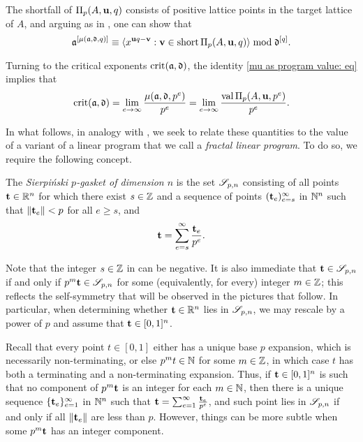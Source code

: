 \documentclass[11pt]{amsart}
\newcommand{\short}{\operatorname{short}}
\begin{document}
The shortfall of $\Pi_p(A, \mathbf{u}, q)$ consists of positive lattice points in the target lattice of $A$, and arguing as in , one can show that
%
\begin{equation}
\label{algebraic shortfall PI_p general: e}
 \ideala^{[\mu(\ideala, \ideald, q)]} \equiv \ideal{x^{\vv{u}q-\vv{v}}: \vv{v} \in \short \IP_p(A,\vv{u},q)} \bmod \ideald^{[q]}.
 \end{equation}



Turning to the critical exponents $\operatorname{crit}(\mathfrak{a}, \mathfrak{d})$, the identity \eqref{mu as program value: eq} implies that
%
\begin{equation}
\label{crit as limit of normalized program values: eq}
\operatorname{crit}(\mathfrak{a},\mathfrak{d}) = \lim_{e\to\infty} \frac{\mu(\mathfrak{a},\mathfrak{d},p^e)}{p^e} = \lim_{e\to\infty} \frac{\operatorname{val} \Pi_p(A,\mathbf{u},p^e)}{p^e}.
\end{equation}
%

In what follows, in analogy with , we seek to relate these quantities to the value of a variant of a linear program that we call a \emph{fractal linear program}.  To do so, we require the following concept.

\begin{definition}
\label{sierpinski: D}
   The \emph{Sierpi\'nski $p$-gasket of dimension $n$} is the set $\mathscr{S}_{p,n}$ consisting of all points $\mathbf{t}\in \mathbb{R}^n$ for which there exist $s \in \mathbb{Z}$ and a sequence of points $( \mathbf{t}_e )_{e=s}^\infty$ in $\mathbb{N}^n$ such that $\| \mathbf{t}_e \| < p$ for all $e \geq s$, and
 \[
\mathbf{t} = \sum_{e=s}^{\infty} \frac{\mathbf{t}_e}{p^e}.
 \]
\end{definition}

Note that the integer $s \in \mathbb{Z}$ in  can be negative.
It is also immediate that $\mathbf{t} \in \mathscr{S}_{p,n}$ if and only if $p^m  \mathbf{t} \in \mathscr{S}_{p,n}$ for some (equivalently, for every) integer $m \in \mathbb{Z}$; this reflects the self-symmetry that will be observed in the pictures that follow. 
In particular, when determining whether $\mathbf{t} \in \mathbb{R}^n$ lies in $\mathscr{S}_{p,n}$, we may rescale by a power of $p$  and assume that $\mathbf{t} \in [0,1]^n$.

Recall that every point $t \in [0,1]$ either has a unique base $p$ expansion, which is necessarily non-terminating, or else $p^m t \in \mathbb{N}$ for some $m \in \mathbb{Z}$, in which case $t$ has both a terminating and a non-terminating expansion.  Thus, if $\mathbf{t} \in [0,1]^n$ is such that no component of $p^m \mathbf{t}$ is an integer for each $m \in \mathbb{N}$, then there is a unique sequence $\{ \mathbf{t}_e \}_{e=1}^{\infty}$ in $ \mathbb{N}^n$ such that $\mathbf{t} = \sum_{e=1}^{\infty} \frac{\mathbf{t}_e}{p^e}$, and such point lies in ${\mathscr{S}}_{p,n}$ if and only if all $\| \mathbf{t}_e \|$ are less than $p$.  However, things can be more subtle when some $p^m \mathbf{t}$ has an integer component.
\end{document}
